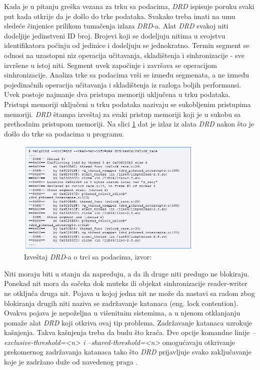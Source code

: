 \documentclass[12pt,oneside]{memoir}
\theoremstyle{plain}
\theoremstyle{definition}
\begin{document}
Kada je u pitanju greška vezana za trku sa podacima, \textit{DRD} ispisuje poruku svaki put kada otkrije da je došlo do trke podataka. Svakako treba imati na umu sledeće činjenice prilikom tumačenja izlaza \textit{DRD}-a. Alat \textit{DRD} svakoj niti dodeljije jedinstveni ID broj. Brojevi koji se dodeljuju nitima u svojstvu identifikatora počinju od jedinice i dodeljuju se jednokratno. Termin segment se odnosi na uzastopni niz  operacija učitavanja, skladištenja i sinhronizacije - sve izvršene u istoj niti. Segment uvek započinje i završava se operacijom sinhronizacije. Analiza trke sa podacima vrši se između segmenata, a ne između pojedinačnih operacija učitavanja i skladištenja iz razloga boljih performansi. Uvek postoje najmanje dva pristupa memoriji uključena u trku podataka. Pristupi memoriji uključeni u trku podataka nazivaju se sukobljenim pristupima memoriji. \textit{DRD} štampa izveštaj za svaki pristup memoriji koji je u sukobu sa prethodnim pristupom memoriji. Na slici \ref{fig:slika2.22} dat je izlaz iz alata \textit{DRD} nakon što je došlo do trke sa podacima u programu. 
\begin{figure}[!ht]
  \centering
  \includegraphics[width=0.8\textwidth]{DRDDataRaceReport.png}
  \caption{Izveštaj \textit{DRD}-a o trci sa podacima, izvor: \cite{Drd}}
  \label{fig:slika2.22}
\end{figure}

Niti moraju biti u stanju da napreduju, a da ih druge niti predugo ne blokiraju. Ponekad nit mora da sačeka dok muteks ili objekat sinhronizacije reader-writer ne otključa druga nit. Pojava u kojoj jedna nit ne može da nastavi sa radom zbog blokiranja drugih niti naziva se zadržavanje katanaca  (eng. lock contention). Ovakva pojava je nepoželjna u višenitnim sistemima, a u njenom otklanjanju pomaže alat \textit{DRD} koji otkriva ovaj tip problema. Zadržavanje katanaca uzrokuje kašnjenja. Takva kašnjenja treba da budu što kraća. Dve opcije komandne linije \textit{--exclusive-threshold=<n> i --shared-threshold=<n>} omogućavaju otkrivanje prekomernog zadržavanja katanaca tako što \textit{DRD} prijavljuje svako zaključavanje koje je zadržano duže od navedenog praga \cite{Drd}. 
\end{document}

